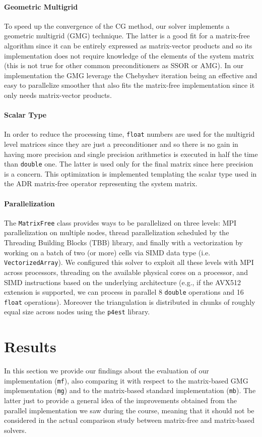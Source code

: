 \documentclass{article}
\begin{document}
\paragraph{Geometric Multigrid}
To speed up the convergence of the CG method, our solver implements a geometric multigrid (GMG) technique. The latter is a good fit for a matrix-free algorithm since it can be entirely expressed as matrix-vector products and so its implementation does not require knowledge of the elements of the system matrix (this is not true for other common preconditioners as SSOR or AMG).
In our implementation the GMG leverage the Chebyshev iteration being an effective and easy to parallelize smoother that also fits the matrix-free implementation since it only needs matrix-vector products.

\paragraph{Scalar Type}
In order to reduce the processing time, \verb|float| numbers are used for the multigrid level matrices since they are just a preconditioner and so there is no gain in having more precision and single precision arithmetics is executed in half the time than 
\verb|double| one. The latter is used only for the final matrix since here precision is a concern. This optimization is implemented templating the scalar type used in the ADR matrix-free operator representing the system matrix.

\paragraph{Parallelization} The \verb|MatrixFree| class provides ways to be parallelized on three levels: MPI parallelization on multiple nodes, thread parallelization scheduled by the Threading Building Blocks (TBB) library, and finally with a vectorization by working on a batch of two (or more) cells via SIMD data type (i.e. \verb|VectorizedArray|). We configured this solver to exploit all these levels with MPI across processors, threading on the available physical cores on a processor, and SIMD instructions based on the underlying architecture (e.g., if the AVX512 extension is supported, we can process in parallel 8 \verb|double| operations and 16 \verb|float| operations). Moreover the triangulation is distributed in chunks of roughly equal size across nodes using the \verb|p4est| library.


\section{Results}
In this section we provide our findings about the evaluation of our implementation (\verb|mf|), also comparing it with respect to the matrix-based GMG implementation (\verb|mg|) and to the matrix-based standard implementation (\verb|mb|). The latter just to provide a general idea of the improvements obtained from the parallel implementation we saw during the course, meaning that it should not be considered in the actual comparison study between matrix-free and matrix-based solvers.
\end{document}
